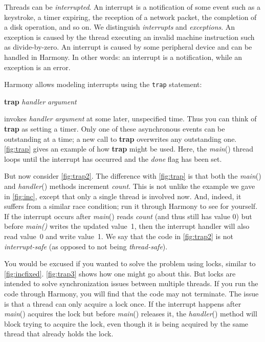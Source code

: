 \documentclass{report}
\newenvironment{code}{
\tcolorbox
}{
\endtcolorbox
}
\begin{document}
Threads can be \emph{interrupted}.  An interrupt is a notification
of some event such as a keystroke, a timer expiring, the reception
of a network packet, the completion of a disk operation, and so on.
We distinguish \emph{interrupts} and \emph{exceptions}.  An exception
is caused by the thread executing an invalid machine instruction
such as divide-by-zero.  An interrupt is caused by some peripheral
device and can be handled in Harmony.  In other words: an interrupt
is a notification, while an exception is an error.  

Harmony allows modeling interrupts using the \texttt{trap} statement:
\begin{code}
\textbf{trap} \textit{handler} \textit{argument}
\end{code}
invokes \textit{handler argument} at some later, unspecified time.
Thus you can think of \textbf{trap} as setting a timer.
Only one of these asynchronous events can be outstanding at a time;
a new call to \textbf{trap} overwrites any outstanding one.
\autoref{fig:trap} gives an example of how \textbf{trap} might be used.
Here, the \textit{main}() thread loops until the interrupt has occurred and
the \textit{done} flag has been set.

But now consider \autoref{fig:trap2}.  The difference with \autoref{fig:trap} is
that both the \textit{main}() and \textit{handler}() methods increment \textit{count}.
This is not unlike the example we gave in \autoref{fig:inc}, except that only a single
thread is involved now.  And, indeed, it suffers from a similar race condition; run
it through Harmony to see for yourself.  If the interrupt occurs after \textit{main}()
reads \textit{count} (and thus still has value 0) but before \textit{main()} writes the
updated value~1, then the interrupt handler will also read value~0 and write value~1.
We say that the code in \autoref{fig:trap2} is not \textit{interrupt-safe} (as opposed
to not being \textit{thread-safe}).

You would be excused if you wanted to solve the problem using locks, similar to
\autoref{fig:incfixed}.  \autoref{fig:trap3} shows how one might go about this.
But locks are intended to solve synchronization issues between multiple threads.
If you run the code through Harmony, you will find that the code may not terminate.
The issue is that a thread can only acquire a lock once.  If the interrupt happens
after \textit{main}() acquires the lock but before \textit{main}() releases it, the
\textit{handler}() method will block trying to acquire the lock, even though
it is being acquired by the same thread that already holds the lock.
\end{document}
